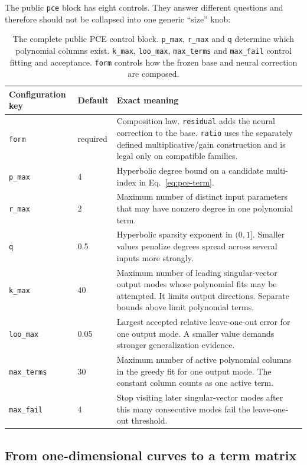 \documentclass[10pt,aps,prd,twocolumn,nofootinbib]{revtex4-2}
\newcommand{\code}[1]{\texttt{#1}}
\begin{document}
The public \code{pce} block has eight controls.  They answer different
questions and therefore should not be collapsed into one generic ``size''
knob:
\begin{table}[t]
\centering
\begin{tabular}{p{}p{}p{}}
\toprule
Configuration key & Default & Exact meaning \\
\midrule
\code{form} & required & Composition law.  \code{residual} adds the neural
correction to the base.  \code{ratio} uses the separately defined
multiplicative/gain construction and is legal only on compatible families.  \\
\code{p\_max} & 4 & Hyperbolic degree bound on a candidate multi-index in
Eq.~\eqref{eq:pce-term}.  \\
\code{r\_max} & 2 & Maximum number of distinct input parameters that may have
nonzero degree in one polynomial term.  \\
\code{q} & 0.5 & Hyperbolic sparsity exponent in $(0,1]$.  Smaller values penalize
degrees spread across several inputs more strongly.  \\
\code{k\_max} & 40 & Maximum number of leading singular-vector output modes
whose polynomial fits may be attempted.  It limits output directions.
Separate bounds above limit polynomial terms.  \\
\code{loo\_max} & 0.05 & Largest accepted relative leave-one-out error for one
output mode.  A smaller value demands stronger generalization evidence.  \\
\code{max\_terms} & 30 & Maximum number of active polynomial columns in the
greedy fit for one output mode.  The constant column counts as one active
term.  \\
\code{max\_fail} & 4 & Stop visiting later singular-vector modes after this
many consecutive modes fail the leave-one-out threshold.  \\
\bottomrule
\end{tabular}
\caption{The complete public PCE control block.  \code{p\_max},
\code{r\_max} and \code{q} determine which polynomial columns exist.
\code{k\_max}, \code{loo\_max}, \code{max\_terms} and \code{max\_fail}
control fitting and acceptance.  \code{form} controls how the frozen base and
neural correction are composed.}
\label{tab:pce-fit-controls}
\end{table}

\subsection{From one-dimensional curves to a term matrix}
\end{document}
